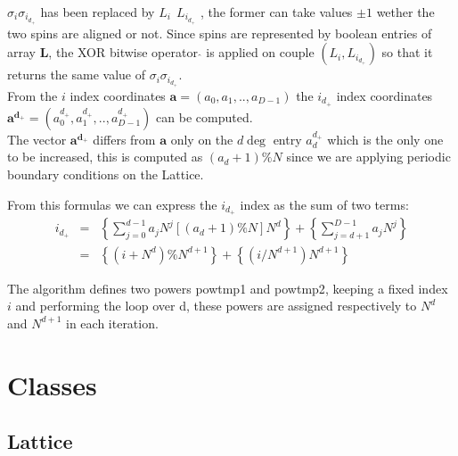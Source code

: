\documentclass[11pt,a4paper]{article}
\begin{document}
$\sigma_i\sigma_{i_{d_+}}$ has been replaced by $L_i \ \hat{} \ L_{i_{d_+}}$ , the former can take values $\pm1$ wether the two spins are aligned or not. Since spins are represented by boolean entries of array $\mathbf{L}$, the XOR bitwise operator $\hat{}$ is applied on couple $(L_i,L_{i_{d_+}})$ so that it returns the same value of $\sigma_i\sigma_{i_{d_+}}$. \\   
\vspace{0.1cm}
From the $i$ index coordinates $\mathbf{a} = (a_0,a_1,..,a_{D-1})$ the $i_{d_+}$ index coordinates 
$\mathbf{a^{d_+}} = (a^{d_+}_0,a^{d_+}_1,..,a^{d_+}_{D-1})$ can be computed. \\
The vector $\mathbf{a^{d_+}}$ differs from $\mathbf{a}$
only on the $d\deg$ entry $a^{d_+}_d$ which is the only one to be increased, this is computed as $(a_d+1)\%N$ since we are applying periodic boundary conditions on the Lattice. 

From this formulas we can express the $i_{d_+}$ index as the sum of two terms:
\begin{eqnarray*}
i_{d_+} &=& \left\{ \sum_{j = 0}^{d-1}a_jN^j  [(a_d + 1)\%N]N^d \right\} + \left\{ \sum_{j = d+1}^{D-1}a_jN^j \right\}  \\
&=& \left\{(i + N^d)\%N^{d+1} \right\}  +  \left\{ (i/N^{d+1})N^{d+1}  \right\} 
\end{eqnarray*}

The algorithm defines two powers \textsf{pow\textunderscore tmp1} and \textsf{pow\textunderscore tmp2}, keeping a fixed index $i$ and performing the loop over d, these powers are assigned respectively to $N^d$ and $N^{d+1}$ in each iteration. 

\section*{Classes}
	
\subsection*{Lattice}
\end{document}
